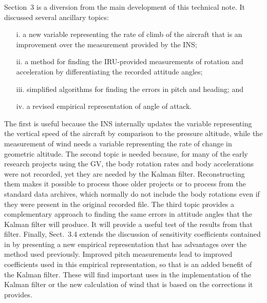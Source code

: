 \documentclass[12pt,twoside,english,12pt,twoside,english]{article}\usepackage[]{graphicx}\usepackage[]{color}
\let\OrgIndex\index
\renewcommand*{\index}[1]{\OrgIndex{#1}}
\begin{document}
Section~3 is a diversion from the main development of this technical
note. It discussed several ancillary topics:
\begin{enumerate}
\item[i.]  a new variable representing the rate of climb
of the aircraft that is an improvement over the measurement
provided by the INS; 
\item[ii.] a method for finding the IRU-provided
measurements
of rotation and acceleration by differentiating the recorded attitude
angles; 
\item[iii.] simplified algorithms
for finding the errors in
pitch and heading; and 
\item[iv.] a revised empirical representation of angle of attack. 
\end{enumerate}
The first is useful because the INS
internally updates the variable representing the vertical speed of
the aircraft by comparison to the pressure
altitude, while the measurement of wind needs
a variable representing the rate of change in geometric
altitude. The second topic is needed because, for many of the early
research projects using the GV, the body
rotation rates and body
accelerations
 were not recorded, yet they are needed by the Kalman filter. Reconstructing
them makes it possible to process those older projects
or to process from the standard data archives, which
normally do not include the body rotations
even if they were present in the original recorded file. The third
topic provides a complementary approach to finding the same errors
in attitude angles that the Kalman filter will
produce. It will provide a useful test of the results from that filter.
Finally, Sect.~3.4 extends the discussion of sensitivity
coefficients
contained in \citet{Cooper2016ncartn} by presenting a new empirical
representation that has advantages over the method used previously.
Improved pitch measurements lead to improved coefficients
used in this empirical representation, so that is an added benefit
of the Kalman filter. These will find important uses in the implementation
of the Kalman filter or the new calculation of wind
that is based on the corrections it provides.
\end{document}
